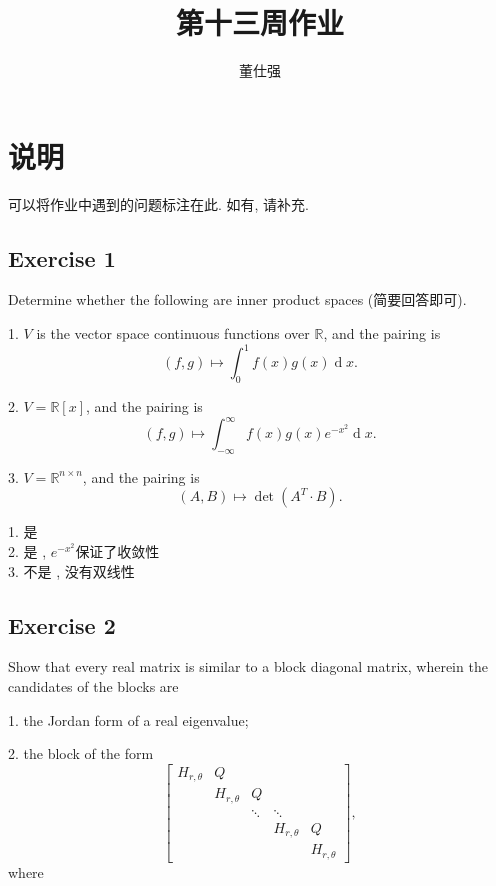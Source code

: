 \documentclass[11pt]{ctexart}
\title{第十三周作业}
\author{董仕强}
\theoremstyle{definition}
\numberwithin{equation}{section}
\theoremstyle{definition}
\theoremstyle{remark}
\begin{document}
\maketitle

\section{说明}

可以将作业中遇到的问题标注在此. 如有, 请补充.

\tableofcontents

\newpage


\subsection{Exercise 1}
Determine whether the following are inner product spaces (简要回答即可).

1. $V$ is the vector space continuous functions over $\mathbb R$, and the pairing is
   $$
   (f,g) \mapsto \int_0^1 f(x)g(x) \operatorname dx.
   $$

2. $V = \mathbb R[x]$, and the pairing is
   $$
   (f,g) \mapsto \int_{-\infty}^\infty f(x)g(x)e^{-x^2} \operatorname dx.
   $$

3. $V = \mathbb R^{n \times n}$, and the pairing is
   $$
   (A,B) \mapsto \det (A^T\cdot B).
   $$
\begin{aaa}
1. 是 \\
2. 是 , $e^{-x^2}$保证了收敛性 \\
3. 不是 , 没有双线性\\

\end{aaa}
\subsection{Exercise 2}
Show that every real matrix is similar to a block diagonal matrix, wherein the candidates of the blocks are

1. the Jordan form of a real eigenvalue;

2. the block of the form
   $$
   \begin{bmatrix}
   H_{r,\theta } & Q &  &  & \\
    & H_{r,\theta } & Q &  & \\
    &  & \ddots  & \ddots  & \\
    &  &  & H_{r,\theta } & Q\\
    &  &  &  & H_{r,\theta }
   \end{bmatrix},
   $$
    where
\end{document}
